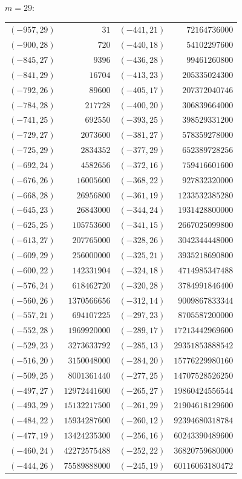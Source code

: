 \noindent$m=29$:\nopagebreak\\[2pt]
{\scriptsize\begin{tabular}{@{}r@{\ \ }r@{\qquad}r@{\ \ }r@{}}
$(-957,29)$ & $31$ & $(-441,21)$ & $72164736000$ \\
$(-900,28)$ & $720$ & $(-440,18)$ & $54102297600$ \\
$(-845,27)$ & $9396$ & $(-436,28)$ & $99461260800$ \\
$(-841,29)$ & $16704$ & $(-413,23)$ & $205335024300$ \\
$(-792,26)$ & $89600$ & $(-405,17)$ & $207372040746$ \\
$(-784,28)$ & $217728$ & $(-400,20)$ & $306839664000$ \\
$(-741,25)$ & $692550$ & $(-393,25)$ & $398529331200$ \\
$(-729,27)$ & $2073600$ & $(-381,27)$ & $578359278000$ \\
$(-725,29)$ & $2834352$ & $(-377,29)$ & $652389728256$ \\
$(-692,24)$ & $4582656$ & $(-372,16)$ & $759416601600$ \\
$(-676,26)$ & $16005600$ & $(-368,22)$ & $927832320000$ \\
$(-668,28)$ & $26956800$ & $(-361,19)$ & $1233532385280$ \\
$(-645,23)$ & $26843000$ & $(-344,24)$ & $1931428800000$ \\
$(-625,25)$ & $105753600$ & $(-341,15)$ & $2667025099800$ \\
$(-613,27)$ & $207765000$ & $(-328,26)$ & $3042344448000$ \\
$(-609,29)$ & $256000000$ & $(-325,21)$ & $3935218690800$ \\
$(-600,22)$ & $142331904$ & $(-324,18)$ & $4714985347488$ \\
$(-576,24)$ & $618462720$ & $(-320,28)$ & $3784991846400$ \\
$(-560,26)$ & $1370566656$ & $(-312,14)$ & $9009867833344$ \\
$(-557,21)$ & $694107225$ & $(-297,23)$ & $8705587200000$ \\
$(-552,28)$ & $1969920000$ & $(-289,17)$ & $17213442969600$ \\
$(-529,23)$ & $3273633792$ & $(-285,13)$ & $29351853888542$ \\
$(-516,20)$ & $3150048000$ & $(-284,20)$ & $15776229980160$ \\
$(-509,25)$ & $8001361440$ & $(-277,25)$ & $14707528526250$ \\
$(-497,27)$ & $12972441600$ & $(-265,27)$ & $19860424556544$ \\
$(-493,29)$ & $15132217500$ & $(-261,29)$ & $21904618129600$ \\
$(-484,22)$ & $15934287600$ & $(-260,12)$ & $92394680318784$ \\
$(-477,19)$ & $13424235300$ & $(-256,16)$ & $60243390489600$ \\
$(-460,24)$ & $42272575488$ & $(-252,22)$ & $36820759680000$ \\
$(-444,26)$ & $75589888000$ & $(-245,19)$ & $60116063180472$ \\
\end{tabular}}\par
